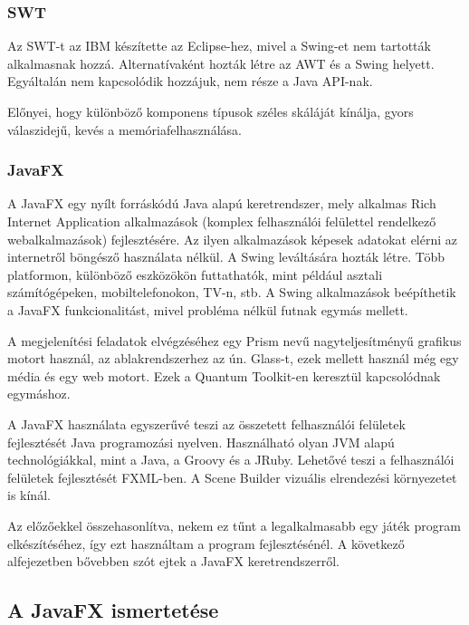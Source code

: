 \subsubsection*{SWT}

Az SWT-t az IBM készítette az Eclipse-hez, mivel a Swing-et nem tartották alkalmasnak hozzá.
Alternatívaként hozták létre az AWT és a Swing helyett.
Egyáltalán nem kapcsolódik hozzájuk, nem része a Java API-nak.\cite{gui}

Előnyei, hogy különböző komponens típusok széles skáláját kínálja, gyors válaszidejű, kevés a memóriafelhasználása.


\subsubsection*{JavaFX}

A JavaFX egy nyílt forráskódú Java alapú keretrendszer, mely alkalmas Rich Internet Application alkalmazások (komplex felhasználói felülettel rendelkező webalkalmazások) fejlesztésére.\cite{javafx}\cite{javafx6}
Az ilyen alkalmazások képesek adatokat elérni az internetről böngésző használata nélkül.
A Swing leváltására hozták létre.
Több platformon, különböző eszközökön futtathatók, mint például asztali számítógépeken, mobiltelefonokon, TV-n, stb.
A Swing alkalmazások beépíthetik a JavaFX funkcionalitást, mivel probléma nélkül futnak egymás mellett.

A megjelenítési feladatok elvégzéséhez egy Prism nevű nagyteljesítményű grafikus motort használ, az ablakrendszerhez az ún. Glass-t, ezek mellett használ még egy média és egy web motort.
Ezek a Quantum Toolkit-en keresztül kapcsolódnak egymáshoz.

A JavaFX használata egyszerűvé teszi az összetett felhasználói felületek fejlesztését Java programozási nyelven.
Használható olyan JVM alapú technológiákkal, mint a Java, a Groovy és a JRuby.
Lehetővé teszi a felhasználói felületek fejlesztését FXML-ben.
A Scene Builder vizuális elrendezési környezetet is kínál.

Az előzőekkel összehasonlítva, nekem ez tűnt a legalkalmasabb egy játék program elkészítéséhez, így ezt használtam a program fejlesztésénél.
A következő alfejezetben bővebben szót ejtek a JavaFX keretrendszerről.


\subsection{A JavaFX ismertetése}

